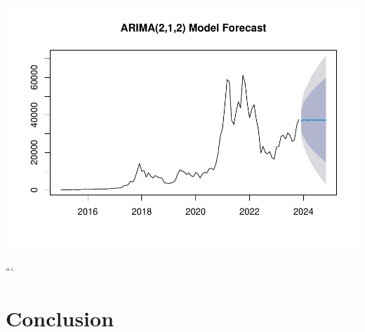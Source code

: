 \documentclass[
]{book}
\begin{document}
\includegraphics{bookdown-demo_files/figure-latex/unnamed-chunk-56-1.pdf}

```

\chapter{Conclusion}\label{conclusion}

  
\end{document}
